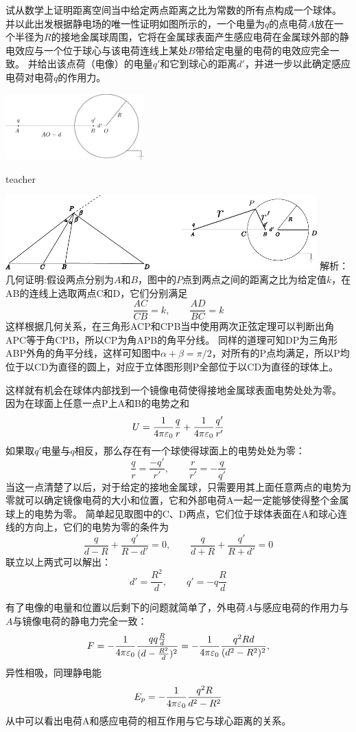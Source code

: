 \begin{example}
试从数学上证明距离空间当中给定两点距离之比为常数的所有点构成一个球体。
并以此出发根据静电场的唯一性证明如图所示的，一个电量为$q$的点电荷$A$放在一个半径为$R$的接地金属球周围，它将在金属球表面产生感应电荷在金属球外部的静电效应与一个位于球心与该电荷连线上某处$B$带给定电量的电荷的电效应完全一致。
并给出该点荷（电像）的电量$q'$和它到球心的距离$d'$，并进一步以此确定感应电荷对电荷$q$的作用力。
\begin{flushright}
\includegraphics[width = 0.4\textwidth]{images/charge-image.pdf} 
\end{flushright}


\begin{taggedblock}{teacher}


\includegraphics[width=0.9\textwidth]{images/charge-image-solution.pdf} 
\noindent
解析：几何证明:假设两点分别为$A$和$B$，图中的$P$点到两点之间的距离之比为给定值$k$，在AB的连线上选取两点C和D，它们分别满足
\[
\frac{AC}{CB}=k,\qquad \frac{AD}{BC}=k
\]
这样根据几何关系，在三角形ACP和CPB当中使用两次正弦定理可以判断出角APC等于角CPB，所以CP为角APB的角平分线。
同样的道理可知DP为三角形ABP外角的角平分线，这样可知图中$\alpha+\beta=\pi/2$，对所有的P点均满足，所以P均位于以CD为直径的圆上，对应于立体图形则P全部位于以CD为直径的球体上。

这样就有机会在球体内部找到一个镜像电荷使得接地金属球表面电势处处为零。
因为在球面上任意一点P上A和B的电势之和
\[
U=\frac{1}{4\pi\varepsilon_0}\frac{q}{r}+\frac{1}{4\pi\varepsilon_0}\frac{q'}{r'}
\]
如果取$q'$电量与$q$相反，那么存在有一个球使得球面上的电势处处为零：
\[
\frac{q}{r}=\frac{-q'}{r'},\qquad \frac{r}{r'}=-\frac{q}{q'}
\]
当这一点清楚了以后，对于给定的接地金属球，只需要用其上面任意两点的电势为零就可以确定镜像电荷的大小和位置，它和外部电荷A一起一定能够使得整个金属球上的电势为零。
简单起见取图中的C、D两点，它们位于球体表面在A和球心连线的方向上，它们的电势为零的条件为
\[ \frac{q}{d-R}+\frac{q'}{R-d'}=0,\qquad \frac{q}{d+R}+\frac{q'}{R+d'}=0 \]
联立以上两式可以解出：
\[  d'=\frac{R^2}{d},\qquad q' = -q\frac{R}{d} \]

有了电像的电量和位置以后剩下的问题就简单了，外电荷$A$与感应电荷的作用力与$A$与镜像电荷的静电力完全一致：
\[F = -\frac{1}{4\pi\varepsilon_0} \frac{q q\frac{R}{d}}{(d-\frac{R^2}{d})^2} =-\frac{1}{4\pi\varepsilon_0}  \frac{q^2 Rd}{(d^2-R^2)^2}, \]
异性相吸，同理静电能
\[E_p = -\frac{1}{4\pi\varepsilon_0}\frac{q^2R}{d^2-R^2}\]
从中可以看出电荷A和感应电荷的相互作用与它与球心距离的关系。


\end{taggedblock}
\end{example}



